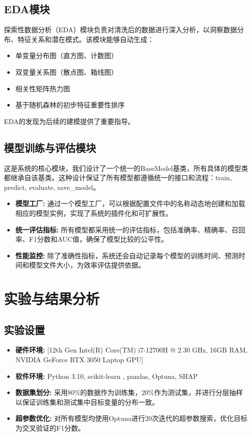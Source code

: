 \documentclass{SYSUReport}
\begin{document}
\subsection{EDA模块}
探索性数据分析（EDA）模块负责对清洗后的数据进行深入分析，以洞察数据分布、特征关系和潜在模式。该模块能够自动生成：
\begin{itemize}
    \item 单变量分布图（直方图、计数图）
    \item 双变量关系图（散点图、箱线图）
    \item 相关性矩阵热力图
    \item 基于随机森林的初步特征重要性排序
\end{itemize}
EDA的发现为后续的建模提供了重要指导。

\subsection{模型训练与评估模块}
这是系统的核心模块，我们设计了一个统一的BaseModel基类，所有具体的模型类都继承自该基类。这种设计保证了所有模型都遵循统一的接口和流程：train, predict, evaluate, save\_model。
\begin{itemize}
    \item \textbf{模型工厂:} 通过一个模型工厂，可以根据配置文件中的名称动态地创建和加载相应的模型实例，实现了系统的插件化和可扩展性。
    \item \textbf{统一评估指标:} 所有模型都采用统一的评估指标，包括准确率、精确率、召回率、F1分数和AUC值，确保了模型比较的公平性。
    \item \textbf{性能监控:} 除了准确性指标，系统还会自动记录每个模型的训练时间、预测时间和模型文件大小，为效率评估提供依据。
\end{itemize}

\section{实验与结果分析}
\subsection{实验设置}
\begin{itemize}
    \item \textbf{硬件环境:} [12th Gen Intel(R) Core(TM) i7-12700H @ 2.30 GHz, 16GB RAM, NVIDIA GeForce RTX 3050 Laptop GPU]
    \item \textbf{软件环境:} Python 3.10, scikit-learn \cite{pedregosa2011scikit}, pandas, Optuna, SHAP
    \item \textbf{数据集划分:} 采用80\%的数据作为训练集，20\%作为测试集，并进行分层抽样以保证训练集和测试集中目标变量的分布一致。
    \item \textbf{超参数优化:} 对所有模型均使用Optuna进行20次迭代的超参数搜索，优化目标为交叉验证的F1分数。
\end{itemize}
\end{document}
